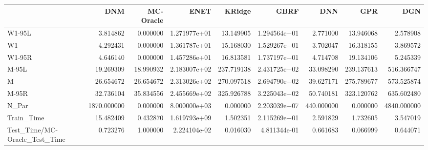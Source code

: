 \begin{tabular}{lrrrrrrrr}
\toprule
{} &          DNM &  MC-Oracle &          ENET &      KRidge &          GBRF &         DNN &         GPR &          DGN \\
\midrule
W1-95L                        &     3.814862 &   0.000000 &  1.271977e+01 &   13.149905 &  1.294564e+01 &    2.771000 &   13.946068 &     2.578908 \\
W1                            &     4.292431 &   0.000000 &  1.361787e+01 &   15.168030 &  1.529267e+01 &    3.702047 &   16.318155 &     3.869572 \\
W1-95R                        &     4.646140 &   0.000000 &  1.457286e+01 &   16.813581 &  1.737197e+01 &    4.714708 &   19.134106 &     5.245339 \\
M-95L                         &    19.269309 &  18.990932 &  2.183007e+02 &  237.719138 &  2.431725e+02 &   33.098290 &  239.137613 &   516.366747 \\
M                             &    26.654672 &  26.654672 &  2.313026e+02 &  270.097518 &  2.694790e+02 &   39.627171 &  275.789677 &   573.525874 \\
M-95R                         &    32.736104 &  35.834556 &  2.455669e+02 &  325.926788 &  3.225043e+02 &   50.740181 &  323.120762 &   635.602480 \\
N\_Par                         &  1870.000000 &   0.000000 &  8.000000e+03 &    0.000000 &  2.203039e+07 &  440.000000 &    0.000000 &  4840.000000 \\
Train\_Time                    &    15.482409 &   0.432870 &  1.619793e+09 &    1.502351 &  2.115269e+01 &    2.591829 &    1.732605 &     3.547019 \\
Test\_Time/MC-Oracle\_Test\_Time &     0.723276 &   1.000000 &  2.224104e-02 &    0.016030 &  4.811344e-01 &    0.661683 &    0.066999 &     0.644071 \\
\bottomrule
\end{tabular}
